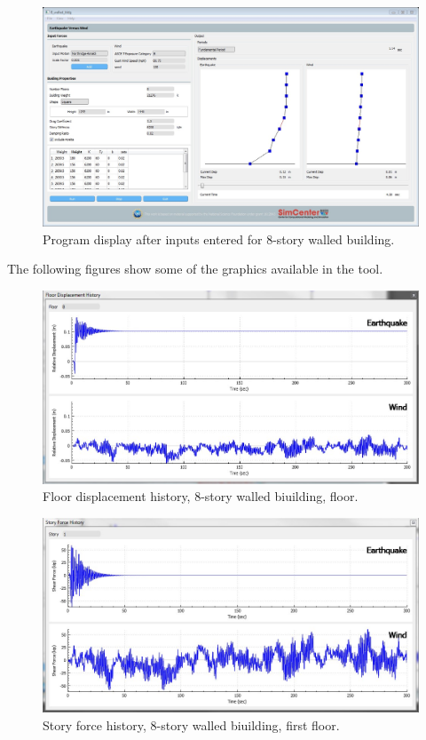 \documentclass{simcenterdocumentation}
\begin{document}
\begin{figure}[H]
	\centering \includegraphics[width=0.9\linewidth]{8_walled_bldg_1.jpg}
	\caption{Program display after inputs entered for 8-story walled building.}
\end{figure}
The following figures show some of the graphics available in the tool.
\begin{figure}[H]
	\centering \includegraphics[scale=0.35]{8_walled_bldg_fdh.jpg}
	\caption{Floor displacement history, 8-story walled biuilding,  floor.}
\end{figure}
\begin{figure}[H]
	\centering \includegraphics[scale=0.35]{8_walled_bldg_sfh.jpg}
	\caption{Story force history, 8-story walled biuilding, first floor.}
\end{figure}
\end{document}
